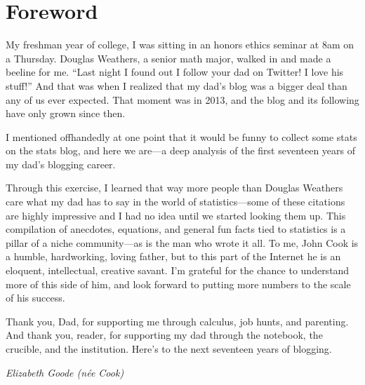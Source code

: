 \chapter*{Foreword}

\begingroup
\setlength{\parskip}{0.6\baselineskip}

My freshman year of college, I was sitting in an honors ethics seminar at 8am on a Thursday. Douglas Weathers, a senior math major, walked in and made a beeline for me. ``Last night I found out I follow your dad on Twitter! I love his stuff!'' And that was when I realized that my dad's blog was a bigger deal than any of us ever expected. That moment was in 2013, and the blog and its following have only grown since then.

I mentioned offhandedly at one point that it would be funny to collect some stats on the stats blog, and here we are---a deep analysis of the first seventeen years of my dad's blogging career.

Through this exercise, I learned that way more people than Douglas Weathers care what my dad has to say in the world of statistics---some of these citations are highly impressive and I had no idea until we started looking them up. This compilation of anecdotes, equations, and general fun facts tied to statistics is a pillar of a niche community---as is the man who wrote it all. To me, John Cook is a humble, hardworking, loving father, but to this part of the Internet he is an eloquent, intellectual, creative savant. I'm grateful for the chance to understand more of this side of him, and look forward to putting more numbers to the scale of his success.

Thank you, Dad, for supporting me through calculus, job hunts, and parenting. And thank you, reader, for supporting my dad through the notebook, the crucible, and the institution. Here's to the next seventeen years of blogging.

\vspace{0.5\baselineskip}
\begin{flushright}
\textit{Elizabeth Goode (n\'{e}e Cook)}
\end{flushright}
\endgroup
